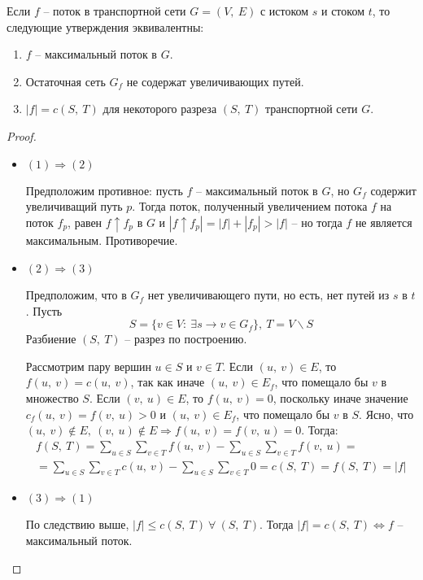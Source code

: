 \documentclass[a4paper,12pt]{article}
\begin{document}
\begin{theorem}
Если $f$ -- поток в транспортной сети $G = (V,\ E)$ с истоком $s$ и стоком $t$, то следующие утверждения эквивалентны:
\begin{enumerate}
    \item $f$ -- максимальный поток в $G$.
    \item Остаточная сеть $G_f$ не содержат увеличивающих путей.
    \item $|f| = c(S,\ T)$ для некоторого разреза $(S,\ T)$ транспортной сети $G$.
\end{enumerate}
\end{theorem}
\begin{proof}
    \begin{itemize}
        \item $(1) \Rightarrow (2)$
        
        Предположим противное: пусть $f$ -- максимальный поток в $G$, но $G_f$ содержит увеличиващий путь $p$. Тогда поток, полученный увеличением потока $f$ на поток $f_p$, равен $f\uparrow f_p$ в $G$ и $|f \uparrow f_p|  = |f| + |f_p| > |f|$ -- но тогда $f$ не является максимальным. Противоречие.
        
        \item $(2) \Rightarrow (3)$
        
        Предположим, что в $G_f$ нет увеличивающего пути, но есть, нет путей из $s$ в $t$. Пусть \[S = \{v \in V :\ \exists s \to v \in G_f\},\ T = V\backslash S\] Разбиение $(S,\ T)$ -- разрез по построению.
        
        Рассмотрим пару вершин $u \in S$ и $v \in T$. Если $(u,\ v) \in E$, то $f(u,\ v) = c(u,\ v)$, так как иначе $(u,\ v) \in E_f$, что помещало бы $v$ в множество $S$. Если $(v,\ u) \in E$, то $f(u,\ v) = 0$, поскольку иначе значение $c_f(u,\ v) = f(v,\ u) > 0$ и $(u,\ v) \in E_f$, что помещало бы $v$ в $S$. Ясно, что $(u,\ v) \notin E,\ (v,\ u) \notin E \Rightarrow f(u,\ v) = f(v,\ u) = 0$. Тогда:
        \begin{gather*}
            f(S,\ T) = \sum\limits_{u \in S}\sum\limits_{v \in T}f(u,\ v) - \sum\limits_{u \in S}\sum\limits_{v \in T}f(v,\ u) =\\= \sum\limits_{u \in S}\sum\limits_{v \in T}c(u,\ v) - \sum\limits_{u \in S}\sum\limits_{v \in T}0 = c(S,\ T) = f(S,\ T) = |f|
        \end{gather*}
        \item $(3) \Rightarrow (1)$
        
        По следствию выше, $|f| \leqslant c(S,\ T)\ \forall\ (S,\ T)$. Тогда $|f| = c(S,\ T) \Longleftrightarrow f$ -- максимальный поток.
    \end{itemize}
\end{proof}
\newpage
\end{document}

